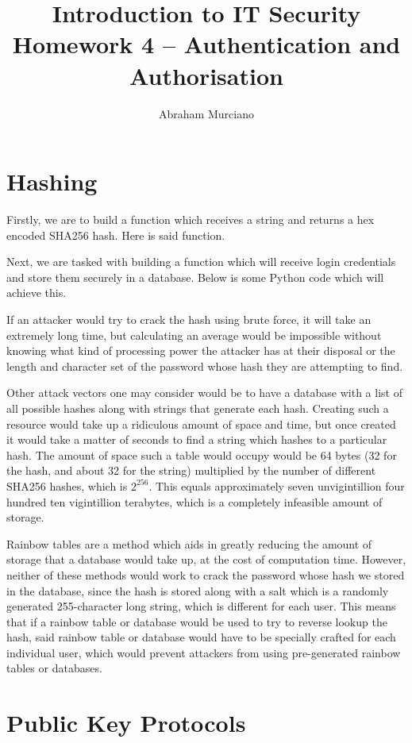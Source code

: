 \documentclass{article}
\title{Introduction to IT Security\\
\medskip
\large Homework 4 -- Authentication and Authorisation}
\author{Abraham Murciano}
\begin{document}
\maketitle

\section{Hashing}

Firstly, we are to build a function which receives a string and returns a hex encoded SHA256 hash. Here is said function.


Next, we are tasked with building a function which will receive login credentials and store them securely in a database. Below is some Python code which will achieve this.


If an attacker would try to crack the hash using brute force, it will take an extremely long time, but calculating an average would be impossible without knowing what kind of processing power the attacker has at their disposal or the length and character set of the password whose hash they are attempting to find.

Other attack vectors one may consider would be to have a database with a list of all possible hashes along with strings that generate each hash. Creating such a resource would take up a ridiculous amount of space and time, but once created it would take a matter of seconds to find a string which hashes to a particular hash. The amount of space such a table would occupy would be 64 bytes (32 for the hash, and about 32 for the string) multiplied by the number of different SHA256 hashes, which is \(2^{256}\). This equals approximately seven unvigintillion four hundred ten vigintillion terabytes, which is a completely infeasible amount of storage.

Rainbow tables are a method which aids in greatly reducing the amount of storage that a database would take up, at the cost of computation time. However, neither of these methods would work to crack the password whose hash we stored in the database, since the hash is stored along with a salt which is a randomly generated 255-character long string, which is different for each user. This means that if a rainbow table or database would be used to try to reverse lookup the hash, said rainbow table or database would have to be specially crafted for each individual user, which would prevent attackers from using pre-generated rainbow tables or databases.

\section{Public Key Protocols}

\end{document}
